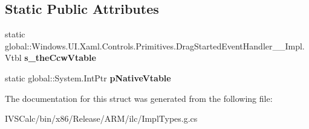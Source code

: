 \subsection*{Static Public Attributes}
\begin{DoxyCompactItemize}
\item 
\mbox{\label{struct_windows_1_1_u_i_1_1_xaml_1_1_controls_1_1_primitives_1_1_drag_started_event_handler_____impl_1_1_vtbl_aafa649c4ce0c5301c29b4389bf22db2e}} 
static global\+::\+Windows.\+U\+I.\+Xaml.\+Controls.\+Primitives.\+Drag\+Started\+Event\+Handler\+\_\+\+\_\+\+Impl.\+Vtbl {\bfseries s\+\_\+the\+Ccw\+Vtable}
\item 
\mbox{\label{struct_windows_1_1_u_i_1_1_xaml_1_1_controls_1_1_primitives_1_1_drag_started_event_handler_____impl_1_1_vtbl_a303b67cd8df1e5e024f922d1d3bbfac9}} 
static global\+::\+System.\+Int\+Ptr {\bfseries p\+Native\+Vtable}
\end{DoxyCompactItemize}


The documentation for this struct was generated from the following file\+:\begin{DoxyCompactItemize}
\item 
I\+V\+S\+Calc/bin/x86/\+Release/\+A\+R\+M/ilc/Impl\+Types.\+g.\+cs\end{DoxyCompactItemize}

